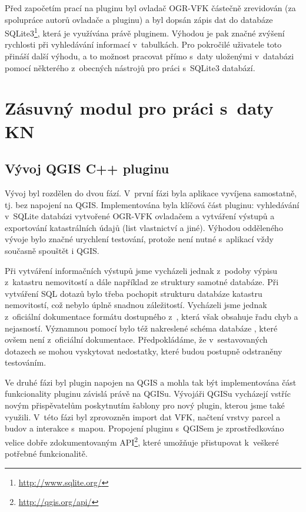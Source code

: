 \documentclass[a4paper,10pt]{article}
\begin{document}
Před započetím prací na pluginu byl ovladač OGR-VFK částečně zrevidován (za spolupráce autorů ovladače a pluginu)
a byl dopsán zápis dat do databáze SQLite3\footnote{\url{http://www.sqlite.org/}}, která je využívána právě pluginem.
Výhodou je pak značné zvýšení rychlosti při vyhledávání informací v~tabulkách.
Pro pokročilé uživatele toto přináší další výhodu, a to možnost pracovat přímo s~daty uloženými v~databázi pomocí některého z~obecných nástrojů pro práci s~SQLite3 databází.


\section{Zásuvný modul pro práci s~daty KN}

\subsection{Vývoj QGIS C++ pluginu}
Vývoj byl rozdělen do dvou fází.
V~první fázi byla aplikace vyvíjena samostatně, tj. bez napojení na QGIS.
Implementována byla klíčová část pluginu: vyhledávání v~SQLite databázi vytvořené OGR-VFK ovladačem a vytváření výstupů a exportování katastrálních údajů (list vlastnictví a jiné).
Výhodou odděleného vývoje bylo značné urychlení testování, protože není nutné s~aplikací vždy současně spouštět i QGIS.

Při vytváření informačních výstupů jsme vycházeli jednak z~podoby výpisu z~katastru nemovitostí a dále například ze struktury samotné databáze.
Při vytváření SQL dotazů bylo třeba pochopit strukturu databáze katastru nemovitostí, což nebylo úplně snadnou záležitostí.
Vycházeli jsme jednak z~oficiální dokumentace formátu dostupného z~\cite{VFKDokumentace},
která však obsahuje řadu  chyb a nejasností.
Významnou pomocí bylo též nakreslené schéma databáze \cite{MartinThesis}, které ovšem není z~oficiální dokumentace.
Předpokládáme, že v~sestavovaných dotazech se mohou vyskytovat nedostatky, které budou postupně odstraněny testováním.

Ve druhé fázi byl plugin napojen na QGIS a mohla tak být implementována část funkcionality pluginu závislá právě na QGISu.
Vývojáři QGISu vycházejí vstříc novým přispěvatelům poskytnutím šablony pro nový plugin, kterou jsme také využili.
V~této fázi byl zprovozněn import dat VFK, načtení vrstvy parcel a budov a interakce s~mapou.
Propojení pluginu s~QGISem je zprostředkováno velice dobře zdokumentovaným API\footnote{\url{http://qgis.org/api/}},
které umožňuje přistupovat k~veškeré potřebné funkcionalitě.
\end{document}
